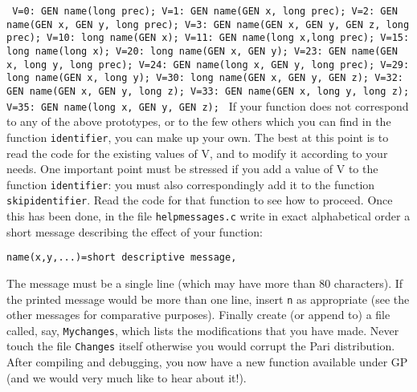 {\tt 
\obeylines
V=0: GEN name(long prec);
V=1: GEN name(GEN x, long prec);
V=2: GEN name(GEN x, GEN y, long prec);
V=3: GEN name(GEN x, GEN y, GEN z, long prec);
V=10: long name(GEN x);
V=11: GEN name(long x,long prec);
V=15: long name(long x);
V=20: long name(GEN x, GEN y);
V=23: GEN name(GEN x, long y, long prec);
V=24: GEN name(long x, GEN y, long prec);
V=29: long name(GEN x, long y);
V=30: long name(GEN x, GEN y, GEN z);
V=32: GEN name(GEN x, GEN y, long z);
V=33: GEN name(GEN x, long y, long z);
V=35: GEN name(long x, GEN y, GEN z);
}
\smallskip
If your function does not correspond to any of the above prototypes, or to the
few others which you can find in the function {\tt identifier}, you can make up
your own. The best at this point is to read the code for the existing values of
V, and to modify it according to your needs. One important point must be 
stressed if you add a value of V to the function {\tt identifier}: you must
also correspondingly add it to the function {\tt skipidentifier}. Read the code
for that function to see how to proceed.
\smallskip
Once this has been done, in the file {\tt helpmessages.c} write in exact
alphabetical order a short message describing the effect of your function:

{\tt \quo name(x,y,...)=short descriptive message\quo,}

The message must be a single line (which may have more than 80 characters). 
If the printed message would be more than one line, insert {\tt \bs n}
as appropriate (see the other messages for comparative purposes).
\smallskip
Finally create (or append to) a file called, say, {\tt Mychanges}, which lists
the modifications that you have made. Never touch the file {\tt Changes} itself
otherwise you would corrupt the Pari distribution.
After compiling and debugging, you now have a new function available under GP
(and we would very much like to hear about it!).





\vfill\eject
